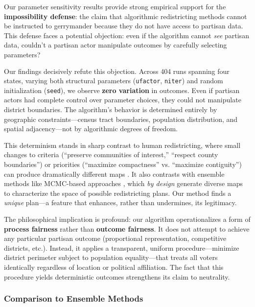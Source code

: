 Our parameter sensitivity results provide strong empirical support for the \textbf{impossibility defense}: the claim that algorithmic redistricting methods cannot be instructed to gerrymander because they do not have access to partisan data. This defense faces a potential objection: even if the algorithm cannot \textit{see} partisan data, couldn't a partisan actor manipulate outcomes by carefully selecting parameters?

Our findings decisively refute this objection. Across 404 runs spanning four states, varying both structural parameters (\texttt{ufactor}, \texttt{niter}) and random initialization (\texttt{seed}), we observe \textbf{zero variation} in outcomes. Even if partisan actors had complete control over parameter choices, they could not manipulate district boundaries. The algorithm's behavior is determined entirely by geographic constraints---census tract boundaries, population distribution, and spatial adjacency---not by algorithmic degrees of freedom.

This determinism stands in sharp contrast to human redistricting, where small changes to criteria (``preserve communities of interest,'' ``respect county boundaries'') or priorities (``maximize compactness'' vs. ``maximize contiguity'') can produce dramatically different maps \citep{stephanopoulos2015partisan}. It also contrasts with ensemble methods like MCMC-based approaches \citep{duchin2021recombination}, which \textit{by design} generate diverse maps to characterize the space of possible redistricting plans. Our method finds a \textit{unique} plan---a feature that enhances, rather than undermines, its legitimacy.

The philosophical implication is profound: our algorithm operationalizes a form of \textbf{process fairness} rather than \textbf{outcome fairness}. It does not attempt to achieve any particular partisan outcome (proportional representation, competitive districts, etc.). Instead, it applies a transparent, uniform procedure---minimize district perimeter subject to population equality---that treats all voters identically regardless of location or political affiliation. The fact that this procedure yields deterministic outcomes strengthens its claim to neutrality.

\subsubsection{Comparison to Ensemble Methods}
\label{sec:ensemble-comparison}

